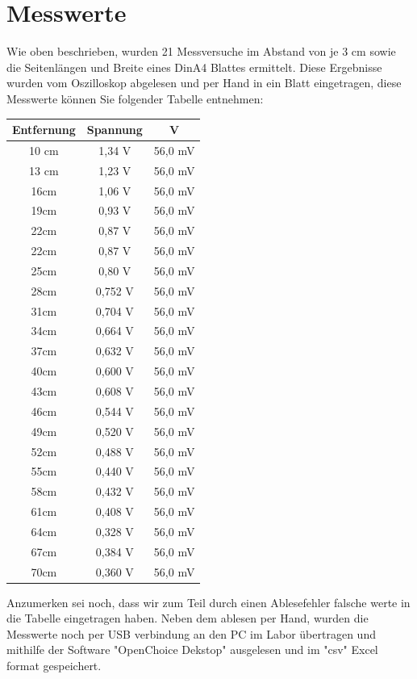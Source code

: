 \documentclass[TGAI_Laborbericht.tex]{subfiles}
\begin{document}
\section{Messwerte}
\label{chap:VERSUCH_1_MESSWERTE}
\begin{flushleft}
Wie oben beschrieben, wurden 21 Messversuche im Abstand von je 3 cm sowie die
Seitenlängen und Breite eines DinA4 Blattes ermittelt. Diese Ergebnisse wurden vom
Oszilloskop abgelesen und per Hand in ein Blatt eingetragen, diese Messwerte können Sie
folgender Tabelle entnehmen:

\begin{tabular}{|c|c|c|}
\hline 
Entfernung & Spannung & V \\ 
\hline 
10 cm & 1,34 V & 56,0 mV \\ 
\hline 
13 cm & 1,23 V & 56,0 mV \\ 
\hline 
16cm & 1,06 V & 56,0 mV \\ 
\hline 
19cm & 0,93 V & 56,0 mV \\
\hline 
22cm & 0,87 V & 56,0 mV \\
\hline 
22cm & 0,87 V & 56,0 mV \\
\hline 
25cm & 0,80 V & 56,0 mV \\ 
\hline 
28cm & 0,752 V & 56,0 mV \\
\hline
31cm & 0,704 V & 56,0 mV \\
\hline
34cm & 0,664 V & 56,0 mV \\
\hline
37cm & 0,632 V & 56,0 mV \\
\hline
40cm & 0,600 V & 56,0 mV \\
\hline
43cm & 0,608 V & 56,0 mV \\
\hline
46cm & 0,544 V & 56,0 mV \\
\hline
49cm & 0,520 V & 56,0 mV \\
\hline
52cm & 0,488 V & 56,0 mV \\
\hline
55cm & 0,440 V & 56,0 mV \\
\hline
58cm & 0,432 V & 56,0 mV \\
\hline
61cm & 0,408 V & 56,0 mV \\
\hline
64cm & 0,328 V & 56,0 mV \\
\hline
67cm & 0,384 V & 56,0 mV \\
\hline
70cm & 0,360 V & 56,0 mV \\
\hline
\end{tabular} 
	
	

	
	



Anzumerken sei noch, dass wir zum Teil durch einen Ablesefehler falsche werte in die Tabelle eingetragen haben.
Neben dem ablesen per Hand, wurden die Messwerte noch per USB verbindung an den PC im Labor übertragen und mithilfe der Software "OpenChoice Dekstop" ausgelesen und im "csv" Excel format gespeichert. 
\end{flushleft}
\end{document}
